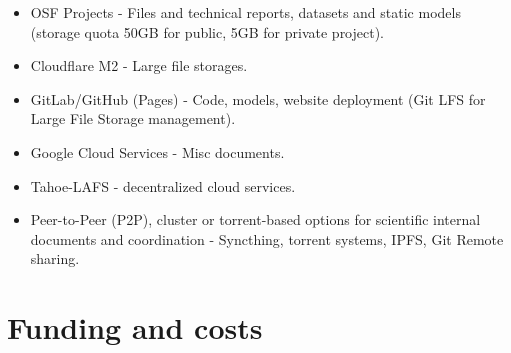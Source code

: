 \documentclass[9pt,a4paper]{article}
\begin{document}
\begin{itemize}
    \item OSF Projects - Files and technical reports, datasets and static models (storage quota 50GB for public, 5GB for private project). 
    \item Cloudflare M2 - Large file storages. 
    \item GitLab/GitHub (Pages) - Code, models, website deployment (Git LFS for Large File Storage management). 
    \item Google Cloud Services - Misc documents. 
    \item Tahoe-LAFS - decentralized cloud services. 
    \item Peer-to-Peer (P2P), cluster or torrent-based options for scientific internal documents and coordination - Syncthing, torrent systems, IPFS, Git Remote sharing. 
\end{itemize}



\section{Funding and costs}
\end{document}
